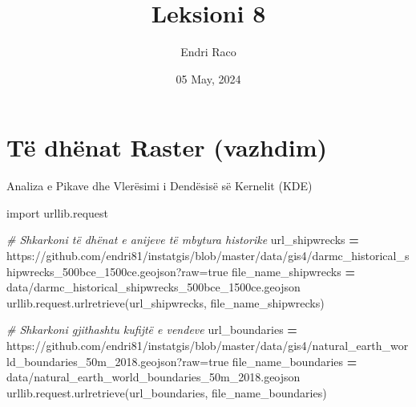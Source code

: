 \documentclass[
  ignorenonframetext,
]{beamer}
\title{Leksioni 8}
\author{Endri Raco}
\date{05 May, 2024}
\newenvironment{Shaded}{\begin{snugshade}}{\end{snugshade}}
\newcommand{\CommentTok}[1]{\textcolor[rgb]{0.56,0.35,0.01}{\textit{#1}}}
\newcommand{\ImportTok}[1]{#1}
\newcommand{\NormalTok}[1]{#1}
\newcommand{\OperatorTok}[1]{\textcolor[rgb]{0.81,0.36,0.00}{\textbf{#1}}}
\newcommand{\StringTok}[1]{\textcolor[rgb]{0.31,0.60,0.02}{#1}}
\begin{document}
\frame{\titlepage}

\begin{frame}[allowframebreaks]
  \tableofcontents[hideallsubsections]
\end{frame}
\hypertarget{tuxeb-dhuxebnat-raster-vazhdim}{%
\section{Të dhënat Raster
(vazhdim)}\label{tuxeb-dhuxebnat-raster-vazhdim}}

\begin{frame}[fragile]{Analiza e Pikave dhe Vlerësimi i Dendësisë së
Kernelit (KDE)}
\protect\hypertarget{analiza-e-pikave-dhe-vleruxebsimi-i-denduxebsisuxeb-suxeb-kernelit-kde}{}

\begin{Shaded}
\begin{Highlighting}[]
\ImportTok{import}\NormalTok{ urllib.request}

\CommentTok{\# Shkarkoni të dhënat e anijeve të mbytura historike}
\NormalTok{url\_shipwrecks }\OperatorTok{=} \StringTok{\textquotesingle{}https://github.com/endri81/instatgis/blob/master/data/gis4/darmc\_historical\_shipwrecks\_500bce\_1500ce.geojson?raw=true\textquotesingle{}}
\NormalTok{file\_name\_shipwrecks }\OperatorTok{=} \StringTok{\textquotesingle{}data/darmc\_historical\_shipwrecks\_500bce\_1500ce.geojson\textquotesingle{}}
\NormalTok{urllib.request.urlretrieve(url\_shipwrecks, file\_name\_shipwrecks)}

\CommentTok{\# Shkarkoni gjithashtu kufijtë e vendeve}
\NormalTok{url\_boundaries }\OperatorTok{=} \StringTok{\textquotesingle{}https://github.com/endri81/instatgis/blob/master/data/gis4/natural\_earth\_world\_boundaries\_50m\_2018.geojson?raw=true\textquotesingle{}}
\NormalTok{file\_name\_boundaries }\OperatorTok{=} \StringTok{\textquotesingle{}data/natural\_earth\_world\_boundaries\_50m\_2018.geojson\textquotesingle{}}
\NormalTok{urllib.request.urlretrieve(url\_boundaries, file\_name\_boundaries)}
\end{Highlighting}
\end{Shaded}
\end{frame}
\end{document}
